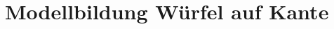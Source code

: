 \ifx\FORMAT\undefined


\fi

\chapter{Modellbildung Würfel auf Kante}
\newpage

\newpage


\ifx\FORMAT\undefined

\fi